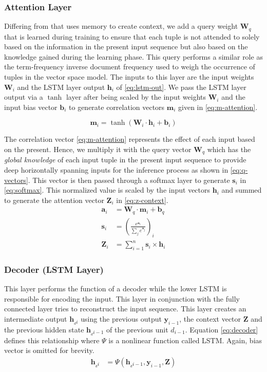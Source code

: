 \subsubsection*{Attention Layer}
\label{subsubsec:attention}
Differing from \cite{salton2017attentive} that uses memory to create context, 
we add a query weight $\bm{W}_q$ that is learned during training to ensure that 
each tuple is not attended to solely based on the information in the present 
input sequence but also based on the knowledge gained during the learning 
phase. This query performs a similar role as the term-frequency inverse 
document frequency used to weigh the occurrence of tuples in the vector space 
model. The inputs to this layer are the 
input weights $\bm{W}_i$ and the LSTM layer output $\bm{h}_{i} $ of 
\eqref{eq:lstm-out}. We pass the LSTM layer output via a $\tanh$ layer after 
being scaled by the input weights $\bm{W}_i $ and the input bias vector $ 
\bm{b}_i $ to generate correlation vectors $ \bm{m}_i $ given in 
\eqref{eq:m-attention}.

\begin{equation}
\label{eq:m-attention}
\bm{m}_i = \tanh (\bm{W}_{i} \cdot \bm{h}_{i} + \bm{b}_i)
\end{equation}

The correlation vector \eqref{eq:m-attention} represents the effect 
of each input based on the present. Hence, we multiply it with the query 
vector $ \bm{W}_q $ which has the \emph{global knowledge} of each input tuple 
in the present input sequence to provide deep horizontally spanning inputs for 
the inference process as shown in \eqref{eq:q-vectors}. This vector is then 
passed through a softmax layer to generate $ \bm{s}_i $ in \eqref{eq:softmax}. 
This normalized value is scaled by the input vectors $ 
\bm{h}_{i}$ and summed to generate the attention vector $ \bm{Z}_i $ in 
\eqref{eq:z-context}.
\begin{align}
\bm{a}_i &= \bm{W}_{q} \cdot \bm{m}_i + \bm{b}_q \label{eq:q-vectors} \\
\bm{s}_i &= \left( \frac{e^{\bm{a}_i}}{\sum_j e^{\bm{a}_j}}\right)_i 
\label{eq:softmax} \\
\bm{Z}_i &= \sum_{i=1}^n \bm{s}_i \times \bm{h}_{i} \label{eq:z-context}
\end{align}

\subsubsection*{Decoder (LSTM Layer)}
This layer performs the function of a decoder while the lower LSTM is 
responsible for encoding the input. This layer in conjunction with the fully 
connected layer tries to reconstruct the input sequence. This layer creates an 
intermediate output $ \bm{h}_{_di} $ using the previous output $ \bm{y}_{i-1} 
$, the context vector $ \bm{Z} $ and the previous
hidden state $\bm{h}_{_di-1}$ of the previous unit $ d_{i-1} $. Equation 
\eqref{eq:decoder} defines this relationship where $ \Psi $ is a nonlinear 
function called LSTM. Again, bias vector is omitted for brevity.
\begin{align}
\bm{h}_{_di} &= \Psi\left(\bm{h}_{_di-1},\bm{y}_{i-1},\bm{Z}\right) 
\label{eq:decoder}
\end{align}


